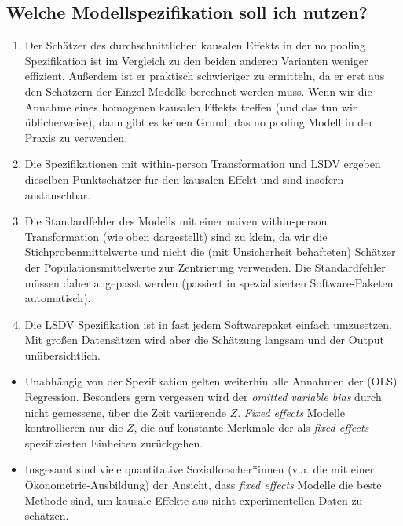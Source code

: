\documentclass[
]{book}
\begin{document}
\hypertarget{welche-modellspezifikation-soll-ich-nutzen}{%
\subsection*{Welche Modellspezifikation soll ich nutzen?}\label{welche-modellspezifikation-soll-ich-nutzen}}

\begin{enumerate}
\def\labelenumi{\arabic{enumi})}
\item
  Der Schätzer des durchschnittlichen kausalen Effekts in der no pooling Spezifikation ist im Vergleich zu den beiden anderen Varianten weniger effizient. Außerdem ist er praktisch schwieriger zu ermitteln, da er erst aus den Schätzern der Einzel-Modelle berechnet werden muss. Wenn wir die Annahme eines homogenen kausalen Effekts treffen (und das tun wir üblicherweise), dann gibt es keinen Grund, das no pooling Modell in der Praxis zu verwenden.
\item
  Die Spezifikationen mit within-person Transformation und LSDV ergeben dieselben Punktschätzer für den kausalen Effekt und sind insofern austauschbar.
\item
  Die Standardfehler des Modells mit einer naiven within-person Transformation (wie oben dargestellt) sind zu klein, da wir die Stichprobenmittelwerte und nicht die (mit Unsicherheit behafteten) Schätzer der Populationsmittelwerte zur Zentrierung verwenden. Die Standardfehler müssen daher angepasst werden (passiert in spezialisierten Software-Paketen automatisch).
\item
  Die LSDV Spezifikation ist in fast jedem Softwarepaket einfach umzusetzen. Mit großen Datensätzen wird aber die Schätzung langsam und der Output unübersichtlich.
\end{enumerate}

\begin{itemize}
\item
  Unabhängig von der Spezifikation gelten weiterhin alle Annahmen der (OLS) Regression. Besonders gern vergessen wird der \emph{omitted variable bias} durch nicht gemessene, über die Zeit variierende \(Z\). \emph{Fixed effects} Modelle kontrollieren nur die \(Z\), die auf konstante Merkmale der als \emph{fixed effects} spezifizierten Einheiten zurückgehen.
\item
  Insgesamt sind viele quantitative Sozialforscher*innen (v.a. die mit einer Ökonometrie-Ausbildung) der Ansicht, dass \emph{fixed effects} Modelle die beste Methode sind, um kausale Effekte aus nicht-experimentellen Daten zu schätzen.
\end{itemize}
\end{document}
